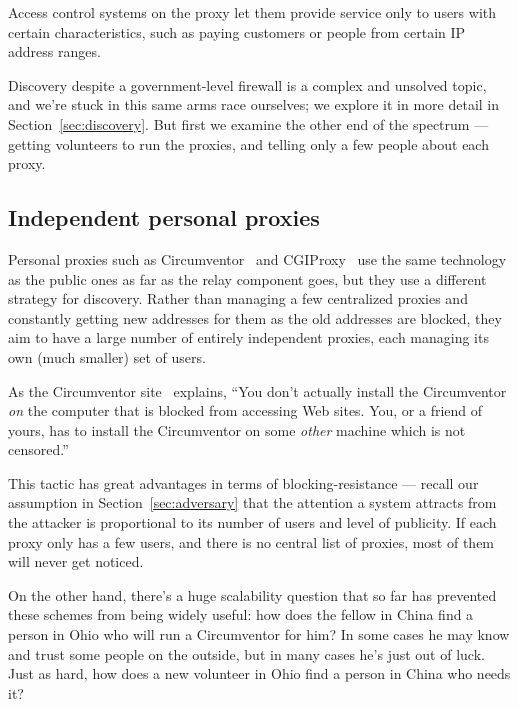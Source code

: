 \documentclass{llncs}
\begin{document}
Access control systems on the proxy let them provide service only to
users with certain characteristics, such as paying customers or people
from certain IP address ranges.

Discovery despite a government-level firewall is a complex and unsolved
topic, and we're stuck in this same arms race ourselves; we explore it
in more detail in Section~\ref{sec:discovery}. But first we examine the
other end of the spectrum --- getting volunteers to run the proxies,
and telling only a few people about each proxy.

\subsection{Independent personal proxies}

Personal proxies such as Circumventor~\cite{circumventor} and
CGIProxy~\cite{cgiproxy} use the same technology as the public ones as
far as the relay component goes, but they use a different strategy for
discovery. Rather than managing a few centralized proxies and constantly
getting new addresses for them as the old addresses are blocked, they
aim to have a large number of entirely independent proxies, each managing
its own (much smaller) set of users.

As the Circumventor site~\cite{circumventor} explains, ``You don't
actually install the Circumventor \emph{on} the computer that is blocked
from accessing Web sites. You, or a friend of yours, has to install the
Circumventor on some \emph{other} machine which is not censored.''

This tactic has great advantages in terms of blocking-resistance ---
recall our assumption in Section~\ref{sec:adversary} that the attention
a system attracts from the attacker is proportional to its number of
users and level of publicity. If each proxy only has a few users, and
there is no central list of proxies, most of them will never get noticed.

On the other hand, there's a huge scalability question that so far has
prevented these schemes from being widely useful: how does the fellow
in China find a person in Ohio who will run a Circumventor for him? In
some cases he may know and trust some people on the outside, but in many
cases he's just out of luck. Just as hard, how does a new volunteer in
Ohio find a person in China who needs it?

\end{document}
